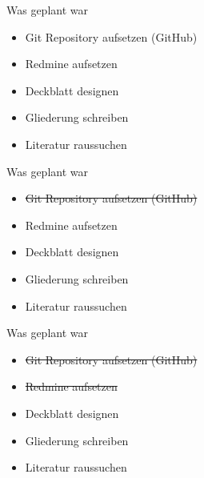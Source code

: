 \documentclass{beamer}
\institute{Universität Hamburg -- Fachbereich Informatik -- Abschlussarbeiten Seminar}
\date{\today}
\title{\myTitle}
\author{\myName}
\begin{document}
{
    \frame{  
        \titlepage
    }
}

\begin{frame}{Was geplant war}
  \begin{itemize}
    \item Git Repository aufsetzen (GitHub)
    \item Redmine aufsetzen
    \item Deckblatt designen
    \item Gliederung schreiben
    \item Literatur raussuchen
  \end{itemize}
\end{frame}

\begin{frame}{Was geplant war}
  \begin{itemize}
    \item \sout{Git Repository aufsetzen (GitHub)}
    \item Redmine aufsetzen
    \item Deckblatt designen
    \item Gliederung schreiben
    \item Literatur raussuchen
  \end{itemize}
\end{frame}

\begin{frame}{Was geplant war}
  \begin{itemize}
    \item \sout{Git Repository aufsetzen (GitHub)}
    \item \sout{Redmine aufsetzen}
    \item Deckblatt designen
    \item Gliederung schreiben
    \item Literatur raussuchen
  \end{itemize}
\end{frame}
\end{document}
